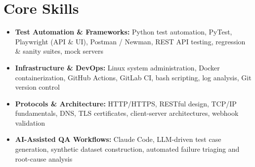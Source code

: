 \documentclass[a4paper,10pt]{article}
\begin{document}
\section{Core Skills}
\begin{itemize}
 \item \textbf{Test Automation \& Frameworks:} Python test automation, PyTest, Playwright (API \& UI), Postman / Newman, REST API testing, regression \& sanity suites, mock servers
 \item \textbf{Infrastructure \& DevOps:} Linux system administration, Docker containerization, GitHub Actions, GitLab CI, bash scripting, log analysis, Git version control
 \item \textbf{Protocols \& Architecture:} HTTP/HTTPS, RESTful design, TCP/IP fundamentals, DNS, TLS certificates, client-server architectures, webhook validation
 \item \textbf{AI-Assisted QA Workflows:} Claude Code, LLM-driven test case generation, synthetic dataset construction, automated failure triaging and root-cause analysis
\end{itemize}
\end{document}
